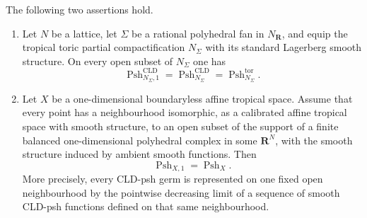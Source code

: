 \begin{theorem}
The following two assertions hold.

\begin{enumerate}
\item Let $N$ be a lattice, let $\Sigma$ be a rational polyhedral fan in
$N_{\mathbf R}$, and equip the tropical toric partial compactification
$N_\Sigma$ with its standard Lagerberg smooth structure.  On every open
subset of $N_\Sigma$ one has
\[
 \operatorname{Psh}^{\mathrm{CLD}}_{N_\Sigma,1}
 =\operatorname{Psh}^{\mathrm{CLD}}_{N_\Sigma}
 =\operatorname{Psh}^{\mathrm{tor}}_{N_\Sigma}.
\]

\item Let $X$ be a one-dimensional boundaryless affine tropical space.
Assume that every point has a neighbourhood isomorphic, as a calibrated
affine tropical space with smooth structure, to an open subset of the
support of a finite balanced one-dimensional polyhedral complex in some
$\mathbf R^N$, with the smooth structure induced by ambient smooth
functions.  Then
\[
                  \operatorname{Psh}_{X,1}
                  =\operatorname{Psh}_X.
\]
More precisely, every CLD-psh germ is represented on one fixed open
neighbourhood by the pointwise decreasing limit of a sequence of smooth
CLD-psh functions defined on that same neighbourhood.
\end{enumerate}
\end{theorem}
